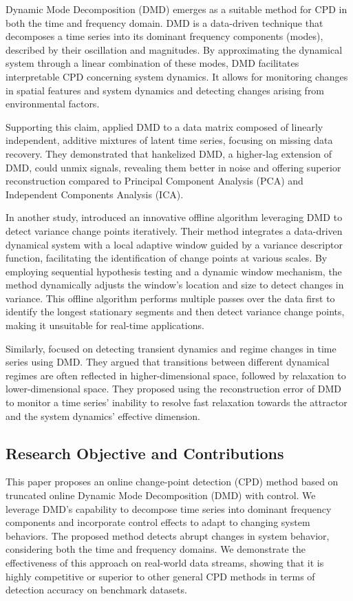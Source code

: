 Dynamic Mode Decomposition (DMD) emerges as a suitable method for CPD in both the time and frequency domain. DMD is a data-driven technique that decomposes a time series into its dominant frequency components (modes), described by their oscillation and magnitudes. By approximating the dynamical system through a linear combination of these modes, DMD facilitates interpretable CPD concerning system dynamics. It allows for monitoring changes in spatial features and system dynamics and detecting changes arising from environmental factors.

Supporting this claim, \citet{Prasadan2020} applied DMD to a data matrix composed of linearly independent, additive mixtures of latent time series, focusing on missing data recovery. They demonstrated that hankelized DMD, a higher-lag extension of DMD, could unmix signals, revealing them better in noise and offering superior reconstruction compared to Principal Component Analysis (PCA) and Independent Components Analysis (ICA).

In another study, \citet{Srivastava2017} introduced an innovative offline algorithm leveraging DMD to detect variance change points iteratively. Their method integrates a data-driven dynamical system with a local adaptive window guided by a variance descriptor function, facilitating the identification of change points at various scales. By employing sequential hypothesis testing and a dynamic window mechanism, the method dynamically adjusts the window's location and size to detect changes in variance. This offline algorithm performs multiple passes over the data first to identify the longest stationary segments and then detect variance change points, making it unsuitable for real-time applications.

Similarly, \citet{Gottwald2020} focused on detecting transient dynamics and regime changes in time series using DMD. They argued that transitions between different dynamical regimes are often reflected in higher-dimensional space, followed by relaxation to lower-dimensional space. They proposed using the reconstruction error of DMD to monitor a time series' inability to resolve fast relaxation towards the attractor and the system dynamics' effective dimension.

\subsection{Research Objective and Contributions}
This paper proposes an online change-point detection (CPD) method based on truncated online Dynamic Mode Decomposition (DMD) with control. We leverage DMD's capability to decompose time series into dominant frequency components and incorporate control effects to adapt to changing system behaviors. The proposed method detects abrupt changes in system behavior, considering both the time and frequency domains. We demonstrate the effectiveness of this approach on real-world data streams, showing that it is highly competitive or superior to other general CPD methods in terms of detection accuracy on benchmark datasets.


